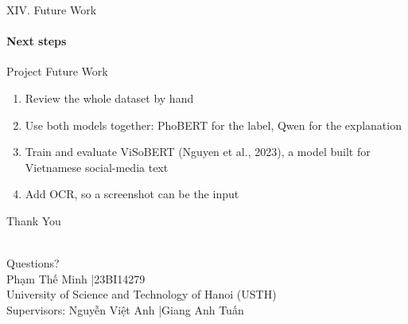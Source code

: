 \documentclass[aspectratio=169,12pt]{beamer}
\begin{document}
\begin{frame}{XIV. Future Work}
  \framesubtitle{Next steps}
  \begin{block}{Project Future Work}
    \begin{enumerate}\itemsep 8pt\small
      \item<2-> Review the whole dataset by hand
      \item<3-> Use both models together: PhoBERT for the label, Qwen for the explanation
      \item<4-> Train and evaluate ViSoBERT (Nguyen et al., 2023), a model built for Vietnamese social-media text
      \item<5-> Add OCR, so a screenshot can be the input
    \end{enumerate}
  \end{block}
\end{frame}

\begin{frame}{Thank You}
  \vfill
  \begin{center}
    \color{CVBLUE}{\Huge\bfseries Thank You}\\[16pt]
    {\Large Questions?}\\[24pt]
    {\normalsize\color{black} Phạm Thế Minh \quad|\quad 23BI14279}\\[6pt]
    {\small\color{black} University of Science and Technology of Hanoi (USTH)}\\[6pt]
    {\footnotesize\mdseries\color{black} Supervisors: Nguyễn Việt Anh \quad|\quad Giang Anh Tuấn}
  \end{center}
  \vfill
\end{frame}
\end{document}
